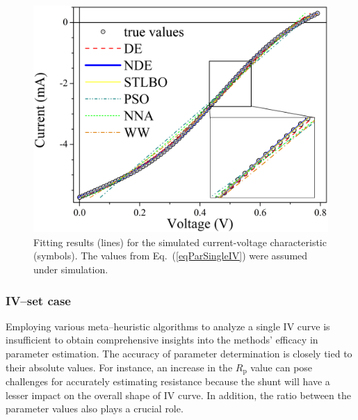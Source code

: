 \documentclass[a4paper,fleqn]{cas-dc}
\begin{document}
\begin{figure}[]
	\centering
		\includegraphics[width=1.0\columnwidth]{IVsimple}
	  \caption{Fitting results (lines) for the simulated current-voltage characteristic (symbols). 
             The values from  Eq.~(\ref{eqParSingleIV}) were assumed under simulation.}\label{figSigleIV}
\end{figure}



\subsubsection{IV--set case}\label{SetIV}
Employing various meta--heuristic algorithms to analyze a single IV curve 
is insufficient to obtain comprehensive insights into the methods' efficacy in parameter estimation.
The accuracy of parameter determination is closely tied to their absolute values.
For instance, an increase in the $R_\mathrm{p}$ value can pose challenges for accurately estimating resistance 
because the shunt will have a lesser impact on the overall shape of IV curve.
In addition, the ratio between the parameter values also plays a crucial role.
\end{document}

